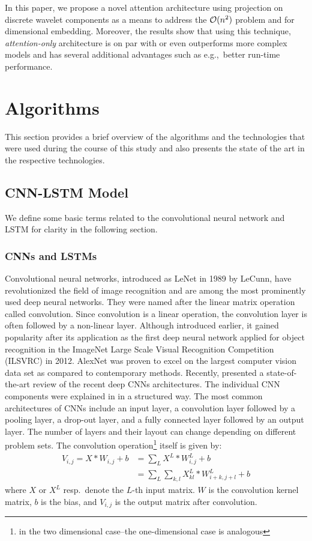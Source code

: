 \documentclass{ieeeaccess}
\begin{document}
In this paper, we propose a novel attention architecture using projection on discrete wavelet components as a means to address the ${\cal O}(n^2)$ problem and for dimensional embedding. Moreover, the results show that using this technique, \emph{attention-only} architecture is on par with or even outperforms more complex models and has several additional advantages such as e.g.,\ better run-time performance.


\section{Algorithms}
This section provides a brief overview of the algorithms and the technologies that were used during the course of this study and also presents the state of the art in the respective technologies.

\subsection{CNN-LSTM Model}
We define some basic terms related to the convolutional neural network and LSTM for clarity in the following section.
\subsubsection{CNNs and LSTMs }
Convolutional neural networks, introduced as LeNet in 1989 by LeCunn, have revolutionized the field of image recognition and are among the most prominently used deep neural networks. They were named after the linear matrix operation called convolution. Since convolution is a linear operation, the convolution layer is often followed by a non-linear layer. Although introduced earlier, it gained popularity after its application as the first deep neural network applied for object recognition in the ImageNet Large Scale Visual Recognition Competition (ILSVRC) in 2012. AlexNet was proven to excel on the largest computer vision data set as compared to contemporary methods. Recently, \cite{cite-key1} presented a state-of-the-art review of the recent deep CNNs architectures. The individual CNN components were explained in \cite{8308186} in a structured way.
The most common architectures of CNNs include an input layer, a convolution layer followed by a pooling layer, a drop-out layer, and a fully connected layer followed by an output layer. The number of layers and their layout can change depending on different problem sets. The convolution operation\footnote{in the two dimensional case--the one-dimensional case is analogous} itself is given by:
\begin{align*}
V_{i,j}= X*W_{i,j}+b    &= \sum_{L}X^L*W^L_{i,j}+b \\
                        &=  \sum_{L}\sum_{k,l} X^L_{kl}*W^L_{i+k,j+l}+b
\end{align*}
where $X$ or $X^L$ resp.\ denote the $L$-th input matrix. $W$ is the convolution kernel matrix, $b$ is the bias, and $V_{i,j}$ is the output matrix after convolution. %
\end{document}
